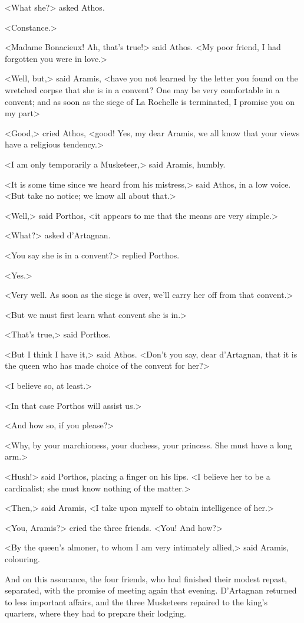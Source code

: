 <What she?> asked Athos. 

<Constance.> 

<Madame Bonacieux! Ah, that's true!> said Athos. <My poor friend, I had forgotten you were in love.> 

<Well, but,> said Aramis, <have you not learned by the letter you found on the wretched corpse that she is in a convent? One may be very comfortable in a convent; and as soon as the siege of La Rochelle is terminated, I promise you on my part\longdash> 

<Good,> cried Athos, <good! Yes, my dear Aramis, we all know that your views have a religious tendency.> 

<I am only temporarily a Musketeer,> said Aramis, humbly. 

<It is some time since we heard from his mistress,> said Athos, in a low voice. <But take no notice; we know all about that.> 

<Well,> said Porthos, <it appears to me that the means are very simple.> 

<What?> asked d'Artagnan. 

<You say she is in a convent?> replied Porthos. 

<Yes.> 

<Very well. As soon as the siege is over, we'll carry her off from that convent.> 

<But we must first learn what convent she is in.> 

<That's true,> said Porthos. 

<But I think I have it,> said Athos. <Don't you say, dear d'Artagnan, that it is the queen who has made choice of the convent for her?> 

<I believe so, at least.> 

<In that case Porthos will assist us.> 

<And how so, if you please?> 

<Why, by your marchioness, your duchess, your princess. She must have a long arm.> 

<Hush!> said Porthos, placing a finger on his lips. <I believe her to be a cardinalist; she must know nothing of the matter.> 

<Then,> said Aramis, <I take upon myself to obtain intelligence of her.> 

<You, Aramis?> cried the three friends. <You! And how?> 

<By the queen's almoner, to whom I am very intimately allied,> said Aramis, colouring. 

And on this assurance, the four friends, who had finished their modest repast, separated, with the promise of meeting again that evening. D'Artagnan returned to less important affairs, and the three Musketeers repaired to the king's quarters, where they had to prepare their lodging. 
